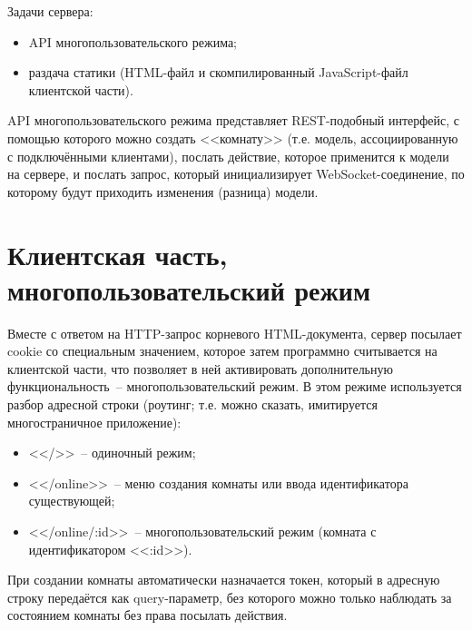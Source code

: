 Задачи сервера:

\begin{itemize}
    \item API многопользовательского режима;
    \item раздача статики (HTML-файл и скомпилированный JavaScript-файл клиентской части).
\end{itemize}

API многопользовательского режима представляет REST-подобный интерфейс,
с помощью которого можно создать <<комнату>> (т.е. модель, ассоциированную с подключёнными клиентами),
послать действие, которое применится к модели на сервере, и послать запрос, который инициализирует WebSocket-соединение,
по которому будут приходить изменения (разница) модели.

\section{Клиентская часть, многопользовательский режим}\label{clientonlineimpl}

\TODO

Вместе с ответом на HTTP-запрос корневого HTML-документа, сервер посылает cookie со специальным значением,
которое затем программно считывается на клиентской части, что позволяет в ней активировать дополнительную функциональность~--
многопользовательский режим. В этом режиме используется разбор адресной строки (роутинг; т.е. можно сказать,
имитируется многостраничное приложение):

\begin{itemize}
    \item <</>>~-- одиночный режим;
    \item <</online>>~-- меню создания комнаты или ввода идентификатора существующей;
    \item <</online/:id>>~-- многопользовательский режим (комната с идентификатором <<:id>>).
\end{itemize}

При создании комнаты автоматически назначается токен, который в адресную строку передаётся как query-параметр,
без которого можно только наблюдать за состоянием комнаты без права посылать действия.

